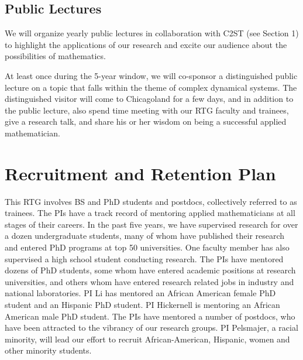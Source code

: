 \documentclass[11pt]{NSFamsart}
\begin{document}
\subsection*{Public Lectures} We will organize yearly public lectures in collaboration with  C2ST (see Section 1) to highlight the applications of   our research and excite our audience about the possibilities of mathematics.  

At least once during the 5-year window, we will co-sponsor a distinguished public lecture  on a topic that falls within the theme of complex dynamical systems.  The distinguished visitor will come to Chicagoland for a few days, and in addition to the public lecture, also spend time meeting with our RTG faculty and trainees, give a research talk, and share his or her wisdom on being a successful applied mathematician. 




\section{Recruitment and Retention Plan} \label{sec:RandR}

This RTG involves BS and PhD students and postdocs, collectively referred to as trainees.  The PIs have a track record of mentoring  applied mathematicians at all stages of their careers.  In the past five years, we have supervised research for over a dozen undergraduate students, many of whom have published their research and entered PhD programs at top 50 universities. One faculty member has also supervised a high school student conducting research.  The PIs have  mentored dozens of PhD students, some whom have entered academic positions at research universities, and others whom have entered research related jobs in industry and national laboratories. PI Li has mentored an African American female PhD student and an Hispanic PhD student. PI Hickernell is mentoring an African American male PhD student.  The PIs have  mentored a number of postdocs, who have been attracted to the vibrancy of our research groups. PI  Pelsmajer, a racial minority, will lead our effort to 
recruit African-American, Hispanic, women and other minority students.
\end{document}
